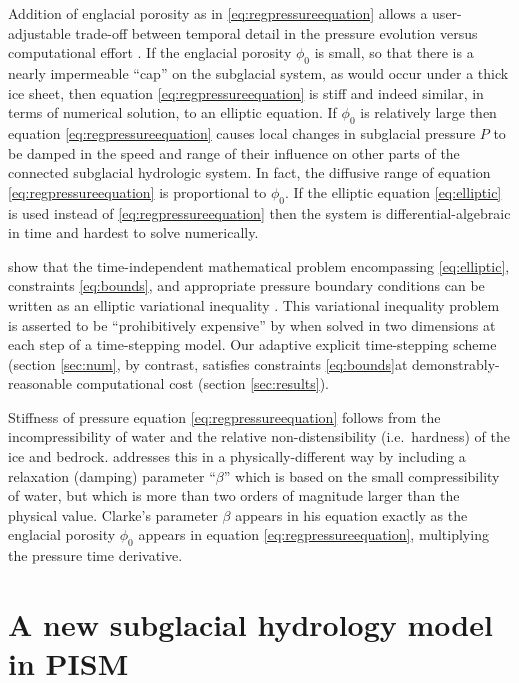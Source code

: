 \documentclass[gmd]{copernicus}   %
\begin{document}
Addition of englacial porosity as in \eqref{eq:regpressureequation} allows a user-adjustable trade-off between temporal detail in the pressure evolution versus computational effort \citep{vanPeltthesis}.  If the englacial porosity $\phi_0$ is small, so that there is a nearly impermeable ``cap'' on the subglacial system, as would occur under a thick ice sheet, then equation \eqref{eq:regpressureequation} is stiff \citep{AscherPetzold} and indeed similar, in terms of numerical solution, to an elliptic equation.  If $\phi_0$ is relatively large then equation \eqref{eq:regpressureequation} causes local changes in subglacial pressure $P$ to be damped in the speed and range of their influence on other parts of the connected subglacial hydrologic system.  In fact, the diffusive range of equation \eqref{eq:regpressureequation} is proportional to $\phi_0$.  If the elliptic equation \eqref{eq:elliptic} is used instead of \eqref{eq:regpressureequation} then the system is differential-algebraic in time \citep{AscherPetzold} and hardest to solve numerically.

\cite{Schoofetal2012} show that the time-independent mathematical problem encompassing \eqref{eq:elliptic}, constraints \eqref{eq:bounds}, and appropriate pressure boundary conditions can be written as an elliptic variational inequality \citep{KinderlehrerStampacchia}.  This variational inequality problem is asserted to be ``prohibitively expensive'' by \cite{Werderetal2013} when solved in two dimensions at each step of a time-stepping model.  Our adaptive explicit time-stepping scheme (section \ref{sec:num}, by contrast, satisfies constraints \eqref{eq:bounds}at demonstrably-reasonable computational cost (section \ref{sec:results}).

Stiffness of pressure equation \eqref{eq:regpressureequation} follows from the incompressibility of water and the relative non-distensibility (i.e.~hardness) of the ice and bedrock.  \cite{Clarke2003} addresses this in a physically-different way by including a relaxation (damping) parameter  ``$\beta$'' which is based on the small compressibility of water, but which is more than two orders of magnitude larger than the physical value.  Clarke's parameter $\beta$ appears in his equation exactly as the englacial porosity $\phi_0$ appears in equation \eqref{eq:regpressureequation}, multiplying the pressure time derivative.


\section{A new subglacial hydrology model in PISM} \label{sec:newmodel}
\end{document}
